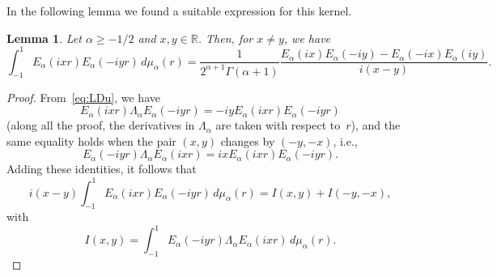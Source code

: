 \documentclass[a4paper]{amsart}
\theoremstyle{plain}
\newtheorem{lemma}{Lemma}
\theoremstyle{remark}
\newcommand{\R}{\mathbb{R}}
\newcommand{\mua}{\mu_\alpha}
\begin{document}
In the following lemma we found a suitable expression for this kernel.

\begin{lemma}
\label{lem:kernel}
Let $\alpha \ge -1/2$ and $x,y \in \R$. Then, for $x \ne y$, we have
\[
  \int_{-1}^1 E_{\alpha}(ixr)E_{\alpha}(-iyr)\, d\mua(r)
  = \frac{1}{2^{\alpha+1}\Gamma(\alpha+1)}
    \frac{E_{\alpha}(ix)E_{\alpha}(-iy)-E_{\alpha}(-ix)E_{\alpha}(iy)}{i(x-y)}.
\]
\end{lemma}

\begin{proof}
From~\eqref{eq:LDu}, we have
\[
  E_{\alpha}(ixr)\Lambda_{\alpha}E_{\alpha}(-iyr) = -iyE_{\alpha}(ixr)E_{\alpha}(-iyr)
\]
(along all the proof, the derivatives in $\Lambda_{\alpha}$ are taken with respect to~$r$),
and the same equality holds when the pair $(x,y)$ changes by $(-y,-x)$, i.e.,
\[
  E_{\alpha}(-iyr)\Lambda_{\alpha}E_{\alpha}(ixr) = ixE_{\alpha}(ixr)E_{\alpha}(-iyr).
\]
Adding these identities, it follows that
\[
  i(x-y)\int_{-1}^1 E_{\alpha}(ixr)E_{\alpha}(-iyr)\,d\mu_{\alpha}(r)
  = I(x,y)+I(-y,-x),
\]
with
\[
  I(x,y) = \int_{-1}^1 E_{\alpha}(-iyr) \Lambda_{\alpha} E_{\alpha}(ixr)\,d\mua(r).
\]


\end{proof}
\end{document}
